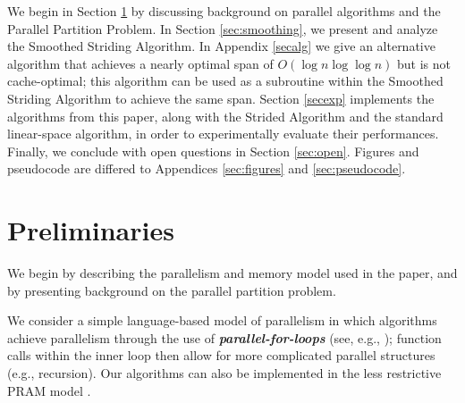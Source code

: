 \documentclass[twoside,leqno,twocolumn]{article}
\newcommand{\defn}[1]{{\textit{\textbf{\boldmath #1}}}}
\renewcommand{\paragraph}[1]{\vspace{0.09in}\noindent{\bf \boldmath #1.}}
\begin{document}


\paragraph{Outline} We begin in Section \ref{secprelim} by discussing
background on parallel algorithms and the Parallel Partition Problem. In
Section \ref{sec:smoothing}, we present and analyze the Smoothed
Striding Algorithm. In Appendix \ref{secalg} we give an alternative
algorithm that achieves a nearly optimal span of
$O(\log n \log \log n)$ but is not cache-optimal; this algorithm can
be used as a subroutine within the Smoothed Striding Algorithm to
achieve the same span. Section \ref{secexp} implements the algorithms
from this paper, along with the Strided Algorithm and the standard
linear-space algorithm, in order to experimentally evaluate their
performances. Finally, we conclude with open questions in Section
\ref{sec:open}. Figures and pseudocode are differed to Appendices
\ref{sec:figures} and \ref{sec:pseudocode}.


\section{Preliminaries}\label{secprelim}

We begin by describing the parallelism and memory model used in
the paper, and by presenting background on the parallel partition problem.

\paragraph{Workflow Model} We consider a simple language-based model of parallelism in which algorithms achieve parallelism through the use of \defn{parallel-for-loops} (see, e.g.,
\cite{Blelloch96,AcarBl16,CLRS}); function calls within the inner loop
then allow for more complicated parallel structures (e.g., recursion). Our algorithms can also be implemented in the less restrictive PRAM model \cite{Blelloch96, AcarBl16}.
\end{document}
